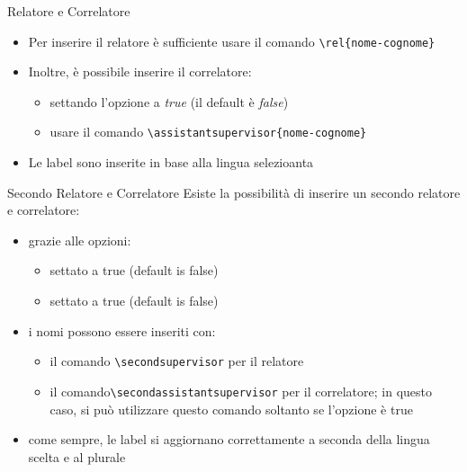 \begin{frame}[t,fragile]{Relatore e Correlatore}
\begin{itemize}
\item Per inserire il relatore è sufficiente usare il comando \verb!\rel{nome-cognome}!
\item Inoltre, è possibile inserire il correlatore:
\begin{itemize}
\item settando l'opzione  a \emph{true} (il default è \emph{false})
\item usare il comando \verb!\assistantsupervisor{nome-cognome}!
\end{itemize}
\item Le label sono inserite in base alla lingua selezioanta
\end{itemize}
\end{frame}

\begin{frame}[t,fragile]{Secondo Relatore e Correlatore}\label{secondrel}
Esiste la possibilità di inserire un secondo relatore e correlatore:
\begin{itemize}
\item grazie alle opzioni:
\begin{itemize}
\item {} settato a true (default is false)
\item {} settato a true (default is false)
\end{itemize}
\item i nomi possono essere inseriti con:
\begin{itemize}
\item il comando \verb!\secondsupervisor! per il relatore
\item il comando\verb!\secondassistantsupervisor! per il correlatore; in questo caso, si può utilizzare questo comando soltanto se l'opzione  è true
\end{itemize}
\item come sempre, le label si aggiornano correttamente a seconda della lingua scelta e al plurale
\end{itemize}
\end{frame}

